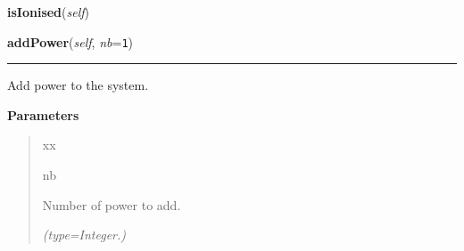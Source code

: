     \label{systems:System:isIonised}

    \vspace{0.5ex}

\hspace{.8\funcindent}\begin{boxedminipage}{\funcwidth}

    \raggedright \textbf{isIonised}(\textit{self})

\setlength{\parskip}{2ex}
\setlength{\parskip}{1ex}
    \end{boxedminipage}

    \label{systems:System:addPower}

    \vspace{0.5ex}

\hspace{.8\funcindent}\begin{boxedminipage}{\funcwidth}

    \raggedright \textbf{addPower}(\textit{self}, \textit{nb}={\tt 1})

    \vspace{-1.5ex}

    \rule{\textwidth}{0.5\fboxrule}
\setlength{\parskip}{2ex}
    Add power to the system.

\setlength{\parskip}{1ex}
      \textbf{Parameters}
      \vspace{-1ex}

      \begin{quote}
        \begin{Ventry}{xx}

          \item[nb]

          Number of power to add.

            {\it (type=Integer.)}

        \end{Ventry}

      \end{quote}

    \end{boxedminipage}

    \label{systems:System:upgradeMaxPower}

